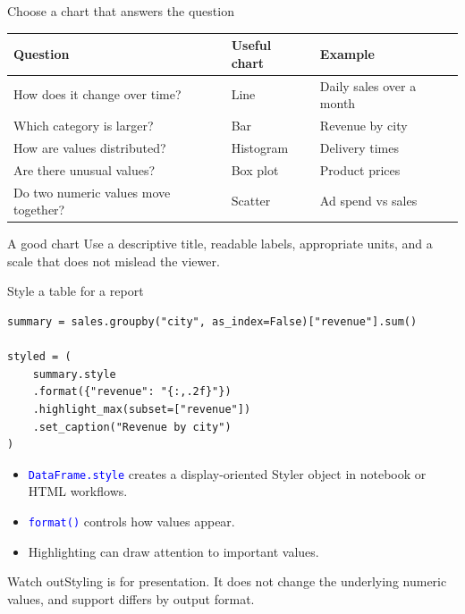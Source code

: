 \documentclass[aspectratio=169,10pt]{beamer}
\newcommand{\pitfall}[1]{\begin{alertblock}{Watch out}#1\end{alertblock}}
\newcommand{\method}[1]{\texttt{\textcolor{Blue}{#1}}}
\begin{document}
\begin{frame}[fragile]{Choose a chart that answers the question}
\begin{tabular}{p{}p{}p{}}
\toprule
\textbf{Question} & \textbf{Useful chart} & \textbf{Example}\\
\midrule
How does it change over time? & Line & Daily sales over a month\\
Which category is larger? & Bar & Revenue by city\\
How are values distributed? & Histogram & Delivery times\\
Are there unusual values? & Box plot & Product prices\\
Do two numeric values move together? & Scatter & Ad spend vs sales\\
\bottomrule
\end{tabular}
\begin{block}{A good chart}
Use a descriptive title, readable labels, appropriate units, and a scale that does not mislead the viewer.
\end{block}
\end{frame}

\begin{frame}[fragile]{Style a table for a report}
\begin{lstlisting}
summary = sales.groupby("city", as_index=False)["revenue"].sum()

styled = (
    summary.style
    .format({"revenue": "{:,.2f}"})
    .highlight_max(subset=["revenue"])
    .set_caption("Revenue by city")
)
\end{lstlisting}
\begin{itemize}
\item \method{DataFrame.style} creates a display-oriented Styler object in notebook or HTML workflows.
\item \method{format()} controls how values appear.
\item Highlighting can draw attention to important values.
\end{itemize}
\pitfall{Styling is for presentation. It does not change the underlying numeric values, and support differs by output format.}
\end{frame}
\end{document}
